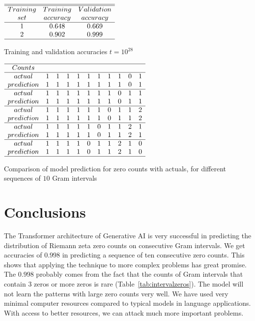 \documentclass[twoside]{article}
\begin{document}
\begin{table}
\centering \(\begin{array}{ccc}
\hline
\hline
Training  & Training &Validation  \\
set     &accuracy&accuracy\\
\hline
1  & 0.648 & 0.669 \\

2  & 0.902 & 0.999 \\
\hline
\end{array}\)
\caption{Training and validation accuracies $t=10^{28}$}
\label{tab:accuracies28}
\end{table}

\begin{table}
\centering \(\begin{array}{ccccccccccc}
\hline
Counts& \\
\hline
actual     &1&1&1&1&1&1&1&1&0&1\\
prediction &1&1&1&1&1&1&1&1&0&1\\
\hline
actual     &1&1&1&1&1&1&1&0&1&1\\
prediction &1&1&1&1&1&1&1&0&1&1\\
\hline
actual     &1&1&1&1&1&1&0&1&1&2\\
prediction &1&1&1&1&1&1&0&1&1&2\\
\hline
actual     &1&1&1&1&1&0&1&1&2&1\\
prediction &1&1&1&1&1&0&1&1&2&1\\
\hline
actual     &1&1&1&1&0&1&1&2&1&0\\
prediction &1&1&1&1&0&1&1&2&1&0\\
\hline
\end{array}\)
\caption{Comparison of model prediction for zero counts with actuals, for different sequences of $10$ Gram intervals} 
\label{tab:perf}
\end{table}

\section{\label{conclusions}Conclusions}
The Transformer architecture of Generative AI is very successful in predicting the distribution of Riemann zeta zero counts on consecutive Gram intervals. We get accuracies of $0.998$
in predicting a sequence of ten consecutive zero counts. This shows that applying the technique to more complex problems has great promise. The $0.998$ probably comes from the fact that the counts of Gram intervals that contain $3$ zeros or more zeros is rare (Table~\ref{tab:intervalzeros}). The model will not learn the patterns with large zero counts very well. We have used very minimal computer resources compared to typical models in language applications. With access to better resources, we can attack much more important problems.
\end{document}
